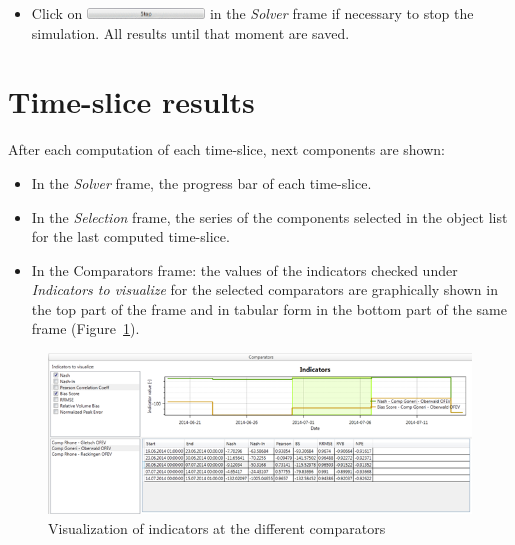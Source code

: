 \documentclass[
  letterpaper,
  DIV=11,
  numbers=noendperiod]{scrreprt}
\providecommand{\tightlist}{%
  \setlength{\itemsep}{0pt}\setlength{\parskip}{0pt}}\usepackage{longtable,booktabs,array}
\begin{document}
\begin{itemize}
\tightlist
\item
  {Click on
  \includegraphics[width=\textwidth,height=0.11in]{./figures/fig-icon_calibrator_stop.png}
  in the \emph{Solver} frame if necessary to stop the simulation. All
  results until that moment are saved.}
\end{itemize}

\hypertarget{time-slice-results}{%
\section{Time-slice results}\label{time-slice-results}}

After each computation of each time-slice, next components are shown:

\begin{itemize}
\item
  In the \emph{Solver} frame, the progress bar of each time-slice.
\item
  In the \emph{Selection} frame, the series of the components selected
  in the object list for the last computed time-slice.
\item
  In the Comparators frame: the values of the indicators checked under
  \emph{Indicators to visualize} for the selected comparators are
  graphically shown in the top part of the frame and in tabular form in
  the bottom part of the same frame
  (Figure~\ref{fig-time_slice_simulation_visualization_indicators}).
\end{itemize}

\begin{figure}

{\centering \includegraphics{./figures/fig-time_slice_simulation_visualization_indicators.png}

}

\caption{\label{fig-time_slice_simulation_visualization_indicators}Visualization
of indicators at the different comparators}

\end{figure}
\end{document}
